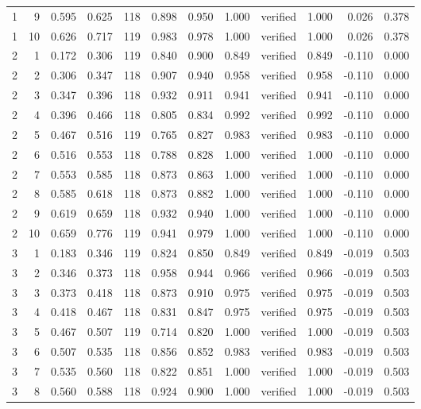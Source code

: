 \begin{tabular}{rrrrrrrrlrrr}
1 & 9 & 0.595 & 0.625 & 118 & 0.898 & 0.950 & 1.000 & verified & 1.000 & 0.026 & 0.378 \\
1 & 10 & 0.626 & 0.717 & 119 & 0.983 & 0.978 & 1.000 & verified & 1.000 & 0.026 & 0.378 \\
2 & 1 & 0.172 & 0.306 & 119 & 0.840 & 0.900 & 0.849 & verified & 0.849 & -0.110 & 0.000 \\
2 & 2 & 0.306 & 0.347 & 118 & 0.907 & 0.940 & 0.958 & verified & 0.958 & -0.110 & 0.000 \\
2 & 3 & 0.347 & 0.396 & 118 & 0.932 & 0.911 & 0.941 & verified & 0.941 & -0.110 & 0.000 \\
2 & 4 & 0.396 & 0.466 & 118 & 0.805 & 0.834 & 0.992 & verified & 0.992 & -0.110 & 0.000 \\
2 & 5 & 0.467 & 0.516 & 119 & 0.765 & 0.827 & 0.983 & verified & 0.983 & -0.110 & 0.000 \\
2 & 6 & 0.516 & 0.553 & 118 & 0.788 & 0.828 & 1.000 & verified & 1.000 & -0.110 & 0.000 \\
2 & 7 & 0.553 & 0.585 & 118 & 0.873 & 0.863 & 1.000 & verified & 1.000 & -0.110 & 0.000 \\
2 & 8 & 0.585 & 0.618 & 118 & 0.873 & 0.882 & 1.000 & verified & 1.000 & -0.110 & 0.000 \\
2 & 9 & 0.619 & 0.659 & 118 & 0.932 & 0.940 & 1.000 & verified & 1.000 & -0.110 & 0.000 \\
2 & 10 & 0.659 & 0.776 & 119 & 0.941 & 0.979 & 1.000 & verified & 1.000 & -0.110 & 0.000 \\
3 & 1 & 0.183 & 0.346 & 119 & 0.824 & 0.850 & 0.849 & verified & 0.849 & -0.019 & 0.503 \\
3 & 2 & 0.346 & 0.373 & 118 & 0.958 & 0.944 & 0.966 & verified & 0.966 & -0.019 & 0.503 \\
3 & 3 & 0.373 & 0.418 & 118 & 0.873 & 0.910 & 0.975 & verified & 0.975 & -0.019 & 0.503 \\
3 & 4 & 0.418 & 0.467 & 118 & 0.831 & 0.847 & 0.975 & verified & 0.975 & -0.019 & 0.503 \\
3 & 5 & 0.467 & 0.507 & 119 & 0.714 & 0.820 & 1.000 & verified & 1.000 & -0.019 & 0.503 \\
3 & 6 & 0.507 & 0.535 & 118 & 0.856 & 0.852 & 0.983 & verified & 0.983 & -0.019 & 0.503 \\
3 & 7 & 0.535 & 0.560 & 118 & 0.822 & 0.851 & 1.000 & verified & 1.000 & -0.019 & 0.503 \\
3 & 8 & 0.560 & 0.588 & 118 & 0.924 & 0.900 & 1.000 & verified & 1.000 & -0.019 & 0.503 \\

\end{tabular}
